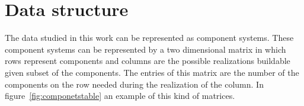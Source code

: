 \chapter{Data structure}\label{ch:structure}

The data studied in this work can be represented as component systems. These component systems can be represented by a two dimensional matrix in which rows represent components and columns are the possible realizations buildable given subset of the components. The entries of this matrix are the number of the components on the row needed during the realization of the column. In figure~\ref{fig:componetstable} an example of this kind of matrices.









